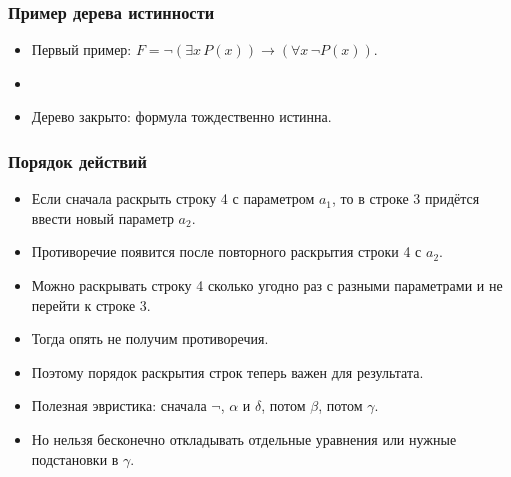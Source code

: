 \documentclass[10pt]{beamer}
\begin{document}
\begin{frame}
\frametitle{Пример дерева истинности}
\begin{itemize}
    \item Первый пример: $F=\neg(\exists x\,P(x))\to(\forall x\,\neg P(x))$.
    \item[]
    \item<5-> Дерево закрыто: формула тождественно истинна.
\end{itemize}
\end{frame}

\begin{frame}
\frametitle{Порядок действий}
\begin{itemize}
    \item Если сначала раскрыть строку 4 с параметром $a_1$, то в строке 3 придётся ввести новый параметр $a_2$.
    \item Противоречие появится после повторного раскрытия строки 4 с $a_2$. \pause
    \item Можно раскрывать строку 4 сколько угодно раз с разными параметрами и не перейти к строке 3.
    \item Тогда опять не получим противоречия. \pause
    \item Поэтому порядок раскрытия строк теперь важен для результата. \pause
    \item Полезная эвристика: сначала $\neg$, $\alpha$ и $\delta$, потом $\beta$, потом $\gamma$. \pause
    \item Но нельзя бесконечно откладывать отдельные уравнения или нужные подстановки в $\gamma$.
\end{itemize}
\end{frame}
\end{document}
